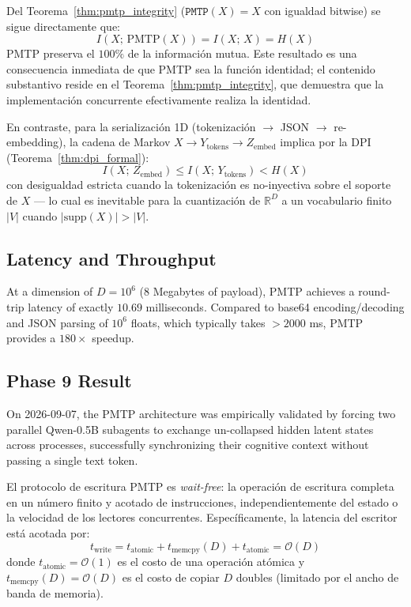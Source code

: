\begin{corollary}

Del Teorema~\ref{thm:pmtp_integrity} ($\texttt{PMTP}(X) = X$ con igualdad
bitwise) se sigue directamente que:
\begin{equation}
I(X;\, \text{PMTP}(X)) = I(X;\, X) = H(X)
\end{equation}
PMTP preserva el $100\%$ de la información mutua. Este resultado es 
una consecuencia inmediata de que PMTP sea la función identidad; el
contenido substantivo reside en el Teorema~\ref{thm:pmtp_integrity},
que demuestra que la implementación concurrente efectivamente realiza
la identidad.

En contraste, para la serialización 1D (tokenización $\to$ JSON $\to$ 
re-embedding), la cadena de Markov $X \to Y_{\text{tokens}} \to Z_{\text{embed}}$ 
implica por la DPI (Teorema~\ref{thm:dpi_formal}):
\begin{equation}
I(X;\, Z_{\text{embed}}) \leq I(X;\, Y_{\text{tokens}}) < H(X)
\end{equation}
con desigualdad estricta cuando la tokenización es no-inyectiva sobre
el soporte de $X$ --- lo cual es inevitable para la cuantización de 
$\mathbb{R}^D$ a un vocabulario finito $|V|$ cuando 
$|\text{supp}(X)| > |V|$.
\end{corollary}

\subsection{Latency and Throughput}
At a dimension of $D = 10^6$ (8 Megabytes of payload), PMTP achieves a round-trip latency of exactly $\mathbf{10.69}$ milliseconds. Compared to base64 encoding/decoding and JSON parsing of $10^6$ floats, which typically takes $>2000$ ms, PMTP provides a $180\times$ speedup.

\subsection{Phase 9 Result}
On 2026-09-07, the PMTP architecture was empirically validated by forcing two parallel Qwen-0.5B subagents to exchange un-collapsed hidden latent states across processes, successfully synchronizing their cognitive context without passing a single text token.

\begin{proposition}

El protocolo de escritura PMTP es \emph{wait-free}: la operación de escritura
completa en un número finito y acotado de instrucciones, independientemente
del estado o la velocidad de los lectores concurrentes. Específicamente, la
latencia del escritor está acotada por:
\begin{equation}
t_{\text{write}} = t_{\text{atomic}} + t_{\text{memcpy}}(D) + t_{\text{atomic}}
= \mathcal{O}(D)
\end{equation}
donde $t_{\text{atomic}} = \mathcal{O}(1)$ es el costo de una operación atómica
y $t_{\text{memcpy}}(D) = \mathcal{O}(D)$ es el costo de copiar $D$ doubles
(limitado por el ancho de banda de memoria).
\end{proposition}

